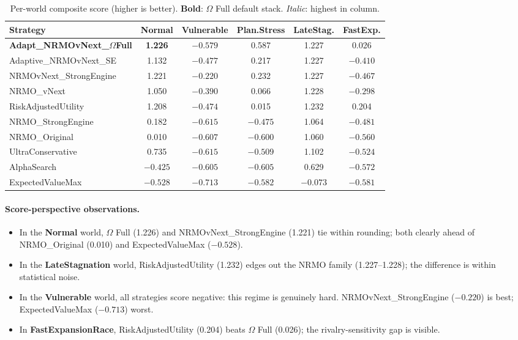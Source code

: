 \begin{table}[ht]
\centering
\scriptsize
\renewcommand{\arraystretch}{1.05}
\begin{tabularx}{\linewidth}{Xccccc}
\toprule
\textbf{Strategy} & \textbf{Normal} & \textbf{Vulnerable} &
\textbf{Plan.Stress} & \textbf{LateStag.} & \textbf{FastExp.} \\
\midrule
\textbf{Adapt\_NRMOvNext\_$\Omega$Full}
& \textbf{1.226} & $-0.579$ & 0.587 & 1.227 & 0.026 \\
Adaptive\_NRMOvNext\_SE
& 1.132 & $-0.477$ & 0.217 & 1.227 & $-0.410$ \\
NRMOvNext\_StrongEngine
& 1.221 & $-0.220$ & 0.232 & 1.227 & $-0.467$ \\
NRMO\_vNext
& 1.050 & $-0.390$ & 0.066 & 1.228 & $-0.298$ \\
RiskAdjustedUtility
& 1.208 & $-0.474$ & 0.015 & 1.232 & 0.204 \\
NRMO\_StrongEngine
& 0.182 & $-0.615$ & $-0.475$ & 1.064 & $-0.481$ \\
NRMO\_Original
& 0.010 & $-0.607$ & $-0.600$ & 1.060 & $-0.560$ \\
UltraConservative
& 0.735 & $-0.615$ & $-0.509$ & 1.102 & $-0.524$ \\
AlphaSearch
& $-0.425$ & $-0.605$ & $-0.605$ & 0.629 & $-0.572$ \\
ExpectedValueMax
& $-0.528$ & $-0.713$ & $-0.582$ & $-0.073$ & $-0.581$ \\
\bottomrule
\end{tabularx}
\caption[Per-world composite scores]{Per-world composite score
(higher is better). \textbf{Bold}: $\Omega$ Full default stack.
\textit{Italic}: highest in column.}
\label{tab:empirical-per-world-score}
\end{table}

\paragraph{Score-perspective observations.}

\begin{itemize}
\item In the \textbf{Normal} world, $\Omega$ Full (1.226) and
NRMOvNext\_StrongEngine (1.221) tie within rounding; both clearly
ahead of NRMO\_Original (0.010) and ExpectedValueMax ($-0.528$).
\item In the \textbf{LateStagnation} world, RiskAdjustedUtility
(1.232) edges out the NRMO family (1.227--1.228); the difference is
within statistical noise.
\item In the \textbf{Vulnerable} world, all strategies score
negative: this regime is genuinely hard. NRMOvNext\_StrongEngine
($-0.220$) is best; ExpectedValueMax ($-0.713$) worst.
\item In \textbf{FastExpansionRace}, RiskAdjustedUtility (0.204)
beats $\Omega$ Full (0.026); the rivalry-sensitivity gap is
visible.
\end{itemize}

